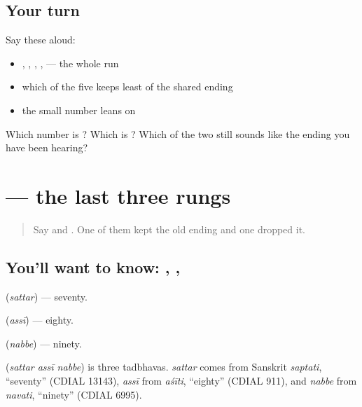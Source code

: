 \subsection*{Your turn}
Say these aloud:

\begin{itemize}
\raggedright
  \item {}, , , ,  — the whole run
  \item which of the five keeps least of the shared ending
  \item the small number  leans on
\end{itemize}

\begin{tcolorbox}[breakable,colback=teal!4,colframe=teal!35!black,title={Before you move on}]
Which number is \textbf{}? Which is \textbf{}? Which of the two still sounds like the ending you have been hearing?
\end{tcolorbox}
\section[\texorpdfstring{\hi{सत्तर} \hi{अस्सी} \hi{नब्बे} (sattar assī nabbe)}{सत्तर अस्सी नब्बे (sattar assī nabbe)}]{   — the last three rungs}

\label{lesson:HI-C96-sattar-assi-nabbe}



\begin{quote}
Say \textbf{} and \textbf{}. One of them kept the old ending and one dropped it.
\end{quote}

\subsection*{You'll want to know: , , }
\textbf{} (\emph{sattar}) — seventy.

\textbf{} (\emph{assī}) — eighty.

\textbf{} (\emph{nabbe}) — ninety.

\begin{cousinweb}
\textbf{  } (\emph{sattar assī nabbe}) is three tadbhavas. \emph{sattar} comes from Sanskrit \emph{saptati}, \textquotedblleft{}seventy\textquotedblright{} (CDIAL 13143), \emph{assī} from \emph{aśīti}, \textquotedblleft{}eighty\textquotedblright{} (CDIAL 911), and \emph{nabbe} from \emph{navati}, \textquotedblleft{}ninety\textquotedblright{} (CDIAL 6995).
\end{cousinweb}

